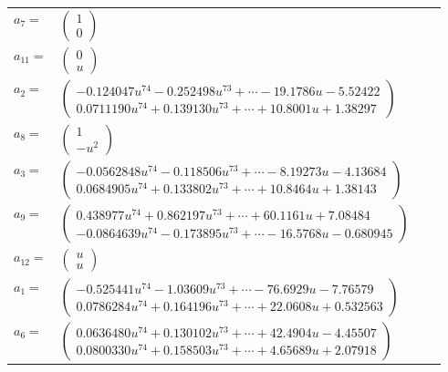 \documentclass[1p]{elsarticle_modified}
\theoremstyle{definition}
\begin{document}
\begin{tabular}{m{7pt} m{180pt} m{7pt} m{180pt} }
\flushright $a_{7}=$&$\begin{pmatrix}1\\0\end{pmatrix}$ \\
\flushright $a_{11}=$&$\begin{pmatrix}0\\u\end{pmatrix}$ \\
\flushright $a_{2}=$&$\begin{pmatrix}-0.124047 u^{74}-0.252498 u^{73}+\cdots-19.1786 u-5.52422\\0.0711190 u^{74}+0.139130 u^{73}+\cdots+10.8001 u+1.38297\end{pmatrix}$ \\
\flushright $a_{8}=$&$\begin{pmatrix}1\\- u^2\end{pmatrix}$ \\
\flushright $a_{3}=$&$\begin{pmatrix}-0.0562848 u^{74}-0.118506 u^{73}+\cdots-8.19273 u-4.13684\\0.0684905 u^{74}+0.133802 u^{73}+\cdots+10.8464 u+1.38143\end{pmatrix}$ \\
\flushright $a_{9}=$&$\begin{pmatrix}0.438977 u^{74}+0.862197 u^{73}+\cdots+60.1161 u+7.08484\\-0.0864639 u^{74}-0.173895 u^{73}+\cdots-16.5768 u-0.680945\end{pmatrix}$ \\
\flushright $a_{12}=$&$\begin{pmatrix}u\\u\end{pmatrix}$ \\
\flushright $a_{1}=$&$\begin{pmatrix}-0.525441 u^{74}-1.03609 u^{73}+\cdots-76.6929 u-7.76579\\0.0786284 u^{74}+0.164196 u^{73}+\cdots+22.0608 u+0.532563\end{pmatrix}$ \\
\flushright $a_{6}=$&$\begin{pmatrix}0.0636480 u^{74}+0.130102 u^{73}+\cdots+42.4904 u-4.45507\\0.0800330 u^{74}+0.158503 u^{73}+\cdots+4.65689 u+2.07918\end{pmatrix}$ \\

\end{tabular}
\end{document}
